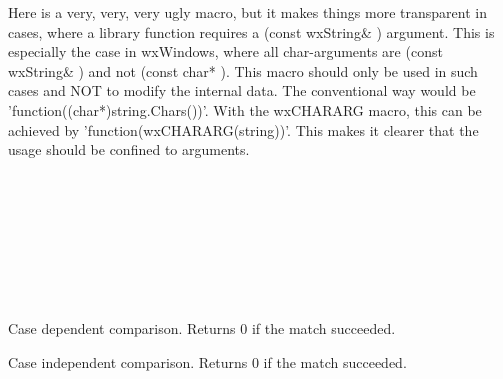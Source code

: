 Here is a very, very, very ugly macro, but it makes things more
transparent in cases, where a library function requires a 
(const wxString\& ) argument. This is especially the case in wxWindows,
where all char-arguments are (const wxString\& ) and not (const char* ).
This macro should only be used in such cases and NOT to
modify the internal data.
The conventional way would be 'function((char*)string.Chars())'.
With the wxCHARARG macro, this can be achieved by 'function(wxCHARARG(string))'.
This makes it clearer that the usage should be confined
to arguments.

\label{wxstringCommonPrefix}

\\

\label{wxstringCommonSuffix}


\label{wxstringCompare}

\\
\\
\\
\\
\\

Case dependent comparison. Returns 0 if the match succeeded.

\label{wxstringFCompare}


Case independent comparison. Returns 0 if the match succeeded.

\label{wxstringComparison}

